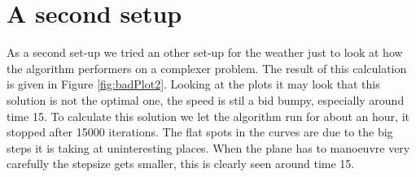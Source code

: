 \section{A second setup}


As a second set-up we tried an other set-up for the weather just to look at how the algorithm performers on a complexer problem.
The result of this calculation is given in  Figure \ref{fig:badPlot2}.
Looking at the plots it may look that this solution is not the optimal one, the speed is stil a bid bumpy, especially around time 15.
To calculate this solution we let the algorithm run for about an hour, it stopped after 15000 iterations.
The flat spots in the curves are due to the big steps it is taking at uninteresting places.
When the plane has to manoeuvre very carefully the stepsize gets smaller, this is clearly seen around time 15.



